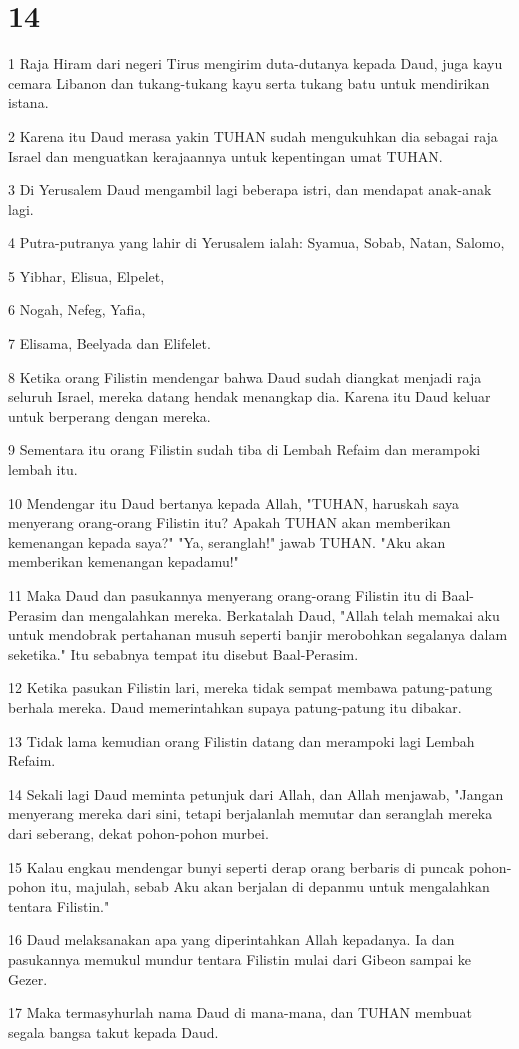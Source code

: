 \chapter{14}

\par 1 Raja Hiram dari negeri Tirus mengirim duta-dutanya kepada Daud, juga kayu cemara Libanon dan tukang-tukang kayu serta tukang batu untuk mendirikan istana.
\par 2 Karena itu Daud merasa yakin TUHAN sudah mengukuhkan dia sebagai raja Israel dan menguatkan kerajaannya untuk kepentingan umat TUHAN.
\par 3 Di Yerusalem Daud mengambil lagi beberapa istri, dan mendapat anak-anak lagi.
\par 4 Putra-putranya yang lahir di Yerusalem ialah: Syamua, Sobab, Natan, Salomo,
\par 5 Yibhar, Elisua, Elpelet,
\par 6 Nogah, Nefeg, Yafia,
\par 7 Elisama, Beelyada dan Elifelet.
\par 8 Ketika orang Filistin mendengar bahwa Daud sudah diangkat menjadi raja seluruh Israel, mereka datang hendak menangkap dia. Karena itu Daud keluar untuk berperang dengan mereka.
\par 9 Sementara itu orang Filistin sudah tiba di Lembah Refaim dan merampoki lembah itu.
\par 10 Mendengar itu Daud bertanya kepada Allah, "TUHAN, haruskah saya menyerang orang-orang Filistin itu? Apakah TUHAN akan memberikan kemenangan kepada saya?" "Ya, seranglah!" jawab TUHAN. "Aku akan memberikan kemenangan kepadamu!"
\par 11 Maka Daud dan pasukannya menyerang orang-orang Filistin itu di Baal-Perasim dan mengalahkan mereka. Berkatalah Daud, "Allah telah memakai aku untuk mendobrak pertahanan musuh seperti banjir merobohkan segalanya dalam seketika." Itu sebabnya tempat itu disebut Baal-Perasim.
\par 12 Ketika pasukan Filistin lari, mereka tidak sempat membawa patung-patung berhala mereka. Daud memerintahkan supaya patung-patung itu dibakar.
\par 13 Tidak lama kemudian orang Filistin datang dan merampoki lagi Lembah Refaim.
\par 14 Sekali lagi Daud meminta petunjuk dari Allah, dan Allah menjawab, "Jangan menyerang mereka dari sini, tetapi berjalanlah memutar dan seranglah mereka dari seberang, dekat pohon-pohon murbei.
\par 15 Kalau engkau mendengar bunyi seperti derap orang berbaris di puncak pohon-pohon itu, majulah, sebab Aku akan berjalan di depanmu untuk mengalahkan tentara Filistin."
\par 16 Daud melaksanakan apa yang diperintahkan Allah kepadanya. Ia dan pasukannya memukul mundur tentara Filistin mulai dari Gibeon sampai ke Gezer.
\par 17 Maka termasyhurlah nama Daud di mana-mana, dan TUHAN membuat segala bangsa takut kepada Daud.

